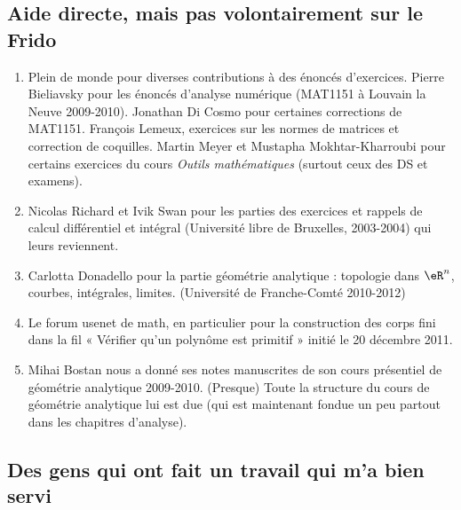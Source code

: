 \subsection{Aide directe, mais pas volontairement sur le Frido}

\begin{enumerate}
    \item
        Plein de monde pour diverses contributions à des énoncés d'exercices. Pierre Bieliavsky pour les énoncés d'analyse numérique (MAT1151 à Louvain la Neuve 2009-2010). Jonathan Di Cosmo pour certaines corrections de MAT1151. François Lemeux, exercices sur les normes de matrices et correction de coquilles.  Martin Meyer et Mustapha Mokhtar-Kharroubi pour certains exercices du cours \emph{Outils mathématiques} (surtout ceux des DS et examens).
    \item
        Nicolas Richard et Ivik Swan pour les parties des exercices et rappels de calcul différentiel et intégral (Université libre de Bruxelles, 2003-2004) qui leurs reviennent.
    \item
	Carlotta Donadello pour la partie géométrie analytique : topologie dans \( \eR^n\), courbes, intégrales, limites. (Université de Franche-Comté 2010-2012)
    \item
        Le forum usenet de math, en particulier pour la construction des corps fini dans la fil « Vérifier qu'un polynôme est primitif » initié le 20 décembre 2011.
    \item
        Mihai Bostan nous a donné ses notes manuscrites de son cours présentiel de géométrie analytique 2009-2010. (Presque) Toute la structure du cours de géométrie analytique lui est due (qui est maintenant fondue un peu partout dans les chapitres d'analyse).
\end{enumerate}

\subsection{Des gens qui ont fait un travail qui m'a bien servi}

